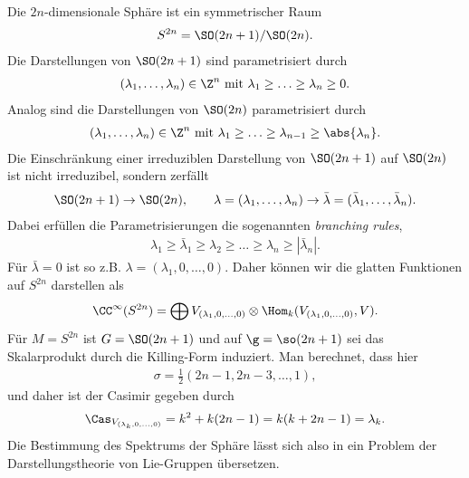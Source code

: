\documentclass[%
	paper=a5,%
	fleqn,%
	DIV=18,%
	BCOR=0mm,
	fontsize=11pt,
	titlepage=false,%
	bibliography=totoc,
	DIV=18,%
	twoside=true,
	pdftitle=Riemannsche Geometrie,
	pdfauthor=Uwe Semmelmann,
	numbers=noendperiod]%
	{scrbook}
\begin{document}
\begin{ex}
Die $2n$-dimensionale Sphäre ist ein symmetrischer Raum
\begin{align*}
S^{2n} = \SO(2n+1)/\SO(2n).
\end{align*}
Die Darstellungen von $\SO(2n+1)$ sind parametrisiert durch
\begin{align*}
(\lambda_{1},\ldots,\lambda_{n})\in\Z^n \text{ mit } \lambda_{1}\ge \ldots\ge \lambda_{n}\ge 0.
\end{align*}
Analog sind die Darstellungen von $\SO(2n)$ parametrisiert durch
\begin{align*}
(\lambda_{1},\ldots,\lambda_{n})\in\Z^n \text{ mit } \lambda_{1}\ge \ldots\ge \lambda_{n-1} \ge \abs{\lambda_{n}}.
\end{align*}
Die Einschränkung einer irreduziblen Darstellung von $\SO(2n+1)$ auf $\SO(2n)$ ist nicht irreduzibel, sondern zerfällt
\begin{align*}
\SO(2n+1)\to \SO(2n),\qquad \lambda=(\lambda_{1},\ldots,\lambda_{n})\to \bar\lambda=(\bar\lambda_{1},\ldots,\bar\lambda_{n}).
\end{align*}
Dabei erfüllen die Parametrisierungen die sogenannten \textit{branching rules},
\begin{align*}
\lambda_{1}\ge \bar\lambda_{1}\ge \lambda_{2} \ge \ldots \ge \lambda_{n} \ge|\bar\lambda_{n}|.
\end{align*}
Für $\bar{\lambda}=0$ ist so z.B. $\lambda=(\lambda_{1},0,\ldots,0)$. Daher können wir die glatten Funktionen auf $S^{2n}$ darstellen als
\begin{align*}
\CC^\infty(S^{2n}) = \bigoplus V_{(\lambda_{1},0,\ldots,0)}\otimes \Hom_{k}(V_{(\lambda_{1},0,\ldots,0)},V).
\end{align*}
Für $M=S^{2n}$ ist $G=\SO(2n+1)$ und auf $\g=\so(2n+1)$ sei das Skalarprodukt durch die Killing-Form induziert. Man berechnet, dass hier
\begin{align*}
\sigma = \frac{1}{2}(2n-1,2n-3,\ldots,1),
\end{align*}
und daher ist der Casimir gegeben durch
\begin{align*}
\Cas_{V_{(\lambda_{k},0,\ldots,0)}} = k^2+k(2n-1) = k(k+2n-1) = \lambda_{k}.
\end{align*}
Die Bestimmung des Spektrums der Sphäre lässt sich also in ein Problem der Darstellungstheorie von Lie-Gruppen übersetzen.\bsp
\end{ex}



\end{document}
